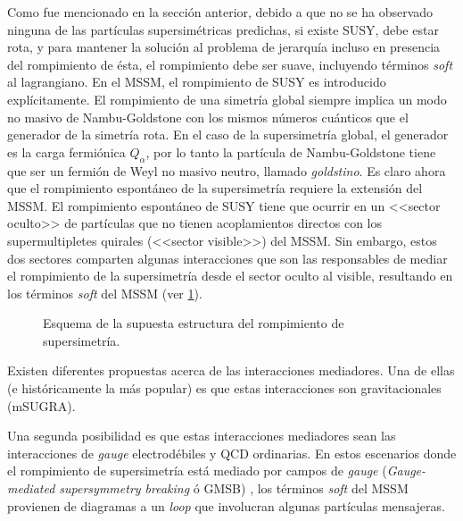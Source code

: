 Como fue mencionado en la sección anterior, debido a que no se ha observado
ninguna de las partículas supersimétricas predichas, si existe SUSY, debe estar
rota, y para mantener la solución al problema de jerarquía incluso en presencia
del rompimiento de ésta, el rompimiento debe ser suave, incluyendo términos
\emph{soft} al lagrangiano.
En el MSSM, el rompimiento de SUSY es introducido explícitamente. El rompimiento
de una simetría global siempre implica un modo no masivo de Nambu-Goldstone con
los mismos números cuánticos que el generador de la simetría rota. En el caso de
la supersimetría global, el generador es la carga fermiónica $Q_\alpha$, por lo
tanto la partícula de Nambu-Goldstone tiene que ser un fermión de Weyl no masivo
neutro, llamado \emph{goldstino}. Es claro ahora que el rompimiento espontáneo
de la supersimetría requiere la extensión del MSSM. El rompimiento espontáneo de
SUSY tiene que ocurrir en un <<sector oculto>> de partículas que no tienen
acoplamientos directos con los supermultipletes quirales (<<sector visible>>)
del MSSM. Sin embargo, estos dos sectores comparten algunas interacciones que
son las responsables de mediar el rompimiento de la supersimetría desde el
sector oculto al visible, resultando en los términos \emph{soft} del MSSM (ver
\cref{fig:susy_breaking}).

\begin{figure}[!htbp]
  \centering
  
  \caption{Esquema de la supuesta estructura del rompimiento de supersimetría.}
  \label{fig:susy_breaking}
\end{figure}

Existen diferentes propuestas acerca de las interacciones mediadores. Una
de ellas (e históricamente la más popular) es que estas interacciones son
gravitacionales (mSUGRA).

Una segunda posibilidad es que estas interacciones mediadores sean las
interacciones de \emph{gauge} electrodébiles y QCD ordinarias. En estos escenarios
donde el rompimiento de supersimetría está mediado por campos de \emph{gauge}
(\emph{Gauge-mediated supersymmetry breaking} ó GMSB) \cite{arxiv:9801271}, los términos
\emph{soft} del MSSM provienen de diagramas a un \emph{loop} que involucran algunas partículas
mensajeras.

